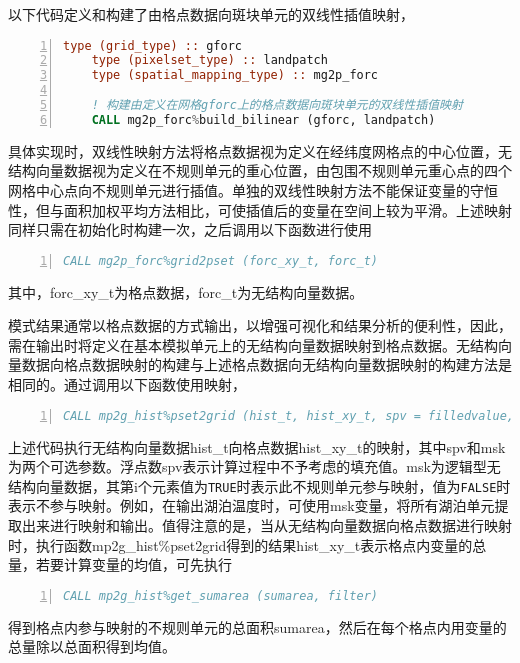 以下代码定义和构建了由格点数据向斑块单元的双线性插值映射，
\begin{lstlisting}[language=fortran, basicstyle=\linespread{1.0}\footnotesize\ttfamily, commentstyle=\color{black}, numbers=left, numberstyle=\tiny, xleftmargin=1.5em,xrightmargin=0em, aboveskip=1em]
    type (grid_type) :: gforc
    type (pixelset_type) :: landpatch
    type (spatial_mapping_type) :: mg2p_forc

    ! 构建由定义在网格gforc上的格点数据向斑块单元的双线性插值映射
    CALL mg2p_forc%build_bilinear (gforc, landpatch)
\end{lstlisting}
具体实现时，双线性映射方法将格点数据视为定义在经纬度网格点的中心位置，无结构向量数据视为定义在不规则单元的重心位置，由包围不规则单元重心点的四个网格中心点向不规则单元进行插值。单独的双线性映射方法不能保证变量的守恒性，但与面积加权平均方法相比，可使插值后的变量在空间上较为平滑。上述映射同样只需在初始化时构建一次，之后调用以下函数进行使用
\begin{lstlisting}[language=fortran, basicstyle=\linespread{1.0}\footnotesize\ttfamily, commentstyle=\color{black}, numbers=left, numberstyle=\tiny, xleftmargin=1.5em,xrightmargin=0em, aboveskip=1em]
    CALL mg2p_forc%grid2pset (forc_xy_t, forc_t)
\end{lstlisting}
其中，forc\_xy\_t为格点数据，forc\_t为无结构向量数据。

模式结果通常以格点数据的方式输出，以增强可视化和结果分析的便利性，因此，需在输出时将定义在基本模拟单元上的无结构向量数据映射到格点数据。无结构向量数据向格点数据映射的构建与上述格点数据向无结构向量数据映射的构建方法是相同的。通过调用以下函数使用映射，
\begin{lstlisting}[language=fortran, basicstyle=\linespread{1.0}\footnotesize\ttfamily, commentstyle=\color{black}, numbers=left, numberstyle=\tiny, xleftmargin=1.5em,xrightmargin=0em, aboveskip=1em]
    CALL mp2g_hist%pset2grid (hist_t, hist_xy_t, spv = filledvalue, msk = filter)
\end{lstlisting}
上述代码执行无结构向量数据hist\_t向格点数据hist\_xy\_t的映射，其中spv和msk为两个可选参数。浮点数spv表示计算过程中不予考虑的填充值。msk为逻辑型无结构向量数据，其第i个元素值为\texttt{TRUE}时表示此不规则单元参与映射，值为\texttt{FALSE}时表示不参与映射。例如，在输出湖泊温度时，可使用msk变量，将所有湖泊单元提取出来进行映射和输出。值得注意的是，当从无结构向量数据向格点数据进行映射时，执行函数mp2g\_hist\%pset2grid得到的结果hist\_xy\_t表示格点内变量的总量，若要计算变量的均值，可先执行
\begin{lstlisting}[language=fortran, basicstyle=\linespread{1.0}\footnotesize\ttfamily, commentstyle=\color{black}, numbers=left, numberstyle=\tiny, xleftmargin=1.5em,xrightmargin=0em, aboveskip=1em]
    CALL mp2g_hist%get_sumarea (sumarea, filter)
\end{lstlisting}
得到格点内参与映射的不规则单元的总面积sumarea，然后在每个格点内用变量的总量除以总面积得到均值。


